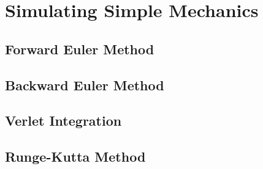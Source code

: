 \section{Simulating Simple Mechanics}
\subsection{Forward Euler Method}
\subsection{Backward Euler Method}
\subsection{Verlet Integration}
\subsection{Runge-Kutta Method}
